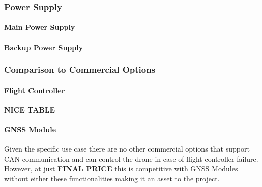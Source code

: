\subsubsection{Power Supply}
\paragraph{Main Power Supply}
\paragraph{Backup Power Supply}

\subsubsection{Comparison to Commercial Options}
\paragraph{Flight Controller}
\textbf{NICE TABLE}
\paragraph{\gls{GNSS} Module}
Given the specific use case there are no other commercial options that support \gls{CAN} communication and can control the drone in case of flight controller failure. However, at just \textbf{FINAL PRICE} this is competitive with GNSS Modules without either these functionalities making it an asset to the project.


